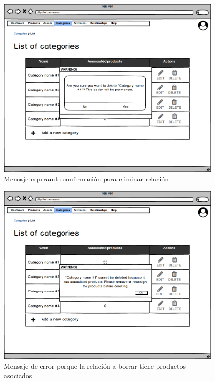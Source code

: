 \vspace{0.20cm}

\begin{figure}[H]
    \includegraphics[width=1\linewidth]{assets/mockups/RF4.4_1.png}
    \caption{Mensaje esperando confirmación para eliminar relación}
   \end{figure}
\vspace{1.0cm}

\begin{figure}[H]
    \includegraphics[width=1\linewidth]{assets/mockups/RF4.4_2.png}
    \caption{Mensaje de error porque la relación a borrar tiene productos asociados}
   \end{figure}
\vspace{1.0cm}

